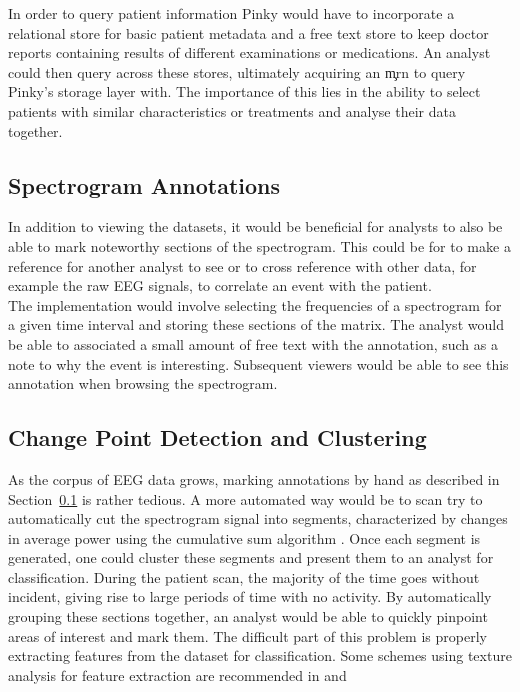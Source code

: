 In order to query patient information Pinky would have to incorporate a
relational store for basic patient metadata and a free text store to keep
doctor reports containing results of different examinations or medications. An
analyst could then query across these stores, ultimately acquiring an \c{mrn}
to query Pinky's storage layer with. The importance of this lies in the ability
to select patients with similar characteristics or treatments and analyse their
data together.

\subsection{Spectrogram Annotations}\label{discuss-ch:annotations}

In addition to viewing the datasets, it would be beneficial for analysts to
also be able to mark noteworthy sections of the spectrogram. This could be for
to make a reference for another analyst to see or to cross reference with other
data, for example the raw EEG signals, to correlate an event with the patient. \\

The implementation would involve selecting the frequencies of a spectrogram for
a given time interval and storing these sections of the matrix.  The analyst
would be able to associated a small amount of free text with the annotation,
such as a note to why the event is interesting. Subsequent viewers would be
able to see this annotation when browsing the spectrogram.

\subsection{Change Point Detection and Clustering}\label{discuss-ch:cpd}

As the corpus of EEG data grows, marking annotations by hand as described in
Section~\ref{discuss-ch:annotations} is rather tedious.  A more automated way
would be to scan try to automatically cut the spectrogram signal into segments,
characterized by changes in average power using the cumulative sum algorithm
\cite{cumsum}. Once each segment is generated, one could cluster these segments
and present them to an analyst for classification. During the patient scan, the
majority of the time goes without incident, giving rise to large periods of
time with no activity. By automatically grouping these sections together, an
analyst would be able to quickly pinpoint areas of interest and mark them. The
difficult part of this problem is properly extracting features from the dataset
for classification. Some schemes using texture analysis for feature extraction
are recommended in \cite{texture-classification1} and
\cite{texture-classification2} \\

